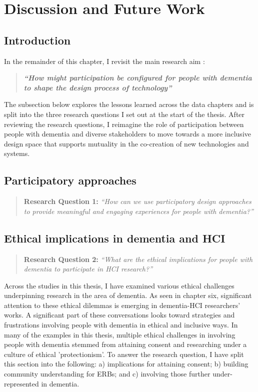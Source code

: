 \chapter{Discussion and Future Work}
\label{Discussion}

\section{Introduction}
\label{Discussion:Intro}
In the remainder of this chapter, I revisit the main research aim :
\begin{quote}
\textbf{\textit{``How might participation be configured for people with dementia to shape the design process of technology''}}
\end{quote}

The subsection below explores the lessons learned across the data chapters and is split into the three research questions I set out at the start of the thesis. After reviewing the research questions, I reimagine the role of participation between people with dementia and diverse stakeholders to move towards a more inclusive design space that supports mutuality in the co-creation of new technologies and systems. 

\section{Participatory approaches}
\label{Discussion:RQ1}
\begin{quote}
\textbf{    Research Question 1:
}    
\textit{    “How can we use participatory design approaches to provide meaningful and engaging experiences for people with dementia?”}
\end{quote}


\section{Ethical implications in dementia and HCI}
\label{Discussion:RQ2}
\begin{quote}
\textbf{    Research Question 2:
}    
\textit{    “What are the ethical implications for people with dementia to participate in HCI research?”}
\end{quote}

Across the studies in this thesis, I have examined various ethical challenges underpinning research in the area of dementia. As seen in chapter six, significant attention to these ethical dilemmas is emerging in dementia-HCI researchers' works. A significant part of these conversations looks toward strategies and frustrations involving people with dementia in ethical and inclusive ways. In many of the examples in this thesis, multiple ethical challenges in involving people with dementia stemmed from attaining consent and researching under a culture of ethical 'protectionism'. To answer the research question, I have split this section into the following: a) implications for attaining consent; b)  building community understanding for ERBs; and c) involving those further under-represented in dementia.

